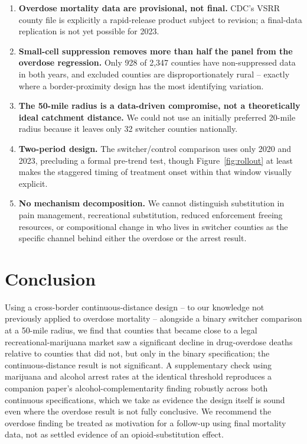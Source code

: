 \documentclass[11pt]{article}
\begin{document}
\begin{enumerate}[label=(\arabic*), leftmargin=*]
\item \textbf{Overdose mortality data are provisional, not final.}
CDC's VSRR county file is explicitly a rapid-release product subject
to revision; a final-data replication is not yet possible for 2023.
\item \textbf{Small-cell suppression removes more than half the panel
from the overdose regression.} Only 928 of 2,347 counties have
non-suppressed data in both years, and excluded counties are
disproportionately rural -- exactly where a border-proximity design has
the most identifying variation.
\item \textbf{The 50-mile radius is a data-driven compromise, not a
theoretically ideal catchment distance.} We could not use an initially
preferred 20-mile radius because it leaves only 32 switcher counties
nationally.
\item \textbf{Two-period design.} The switcher/control comparison uses
only 2020 and 2023, precluding a formal pre-trend test, though
Figure~\ref{fig:rollout} at least makes the staggered timing of
treatment onset within that window visually explicit.
\item \textbf{No mechanism decomposition.} We cannot distinguish
substitution in pain management, recreational substitution, reduced
enforcement freeing resources, or compositional change in who lives in
switcher counties as the specific channel behind either the overdose
or the arrest result.
\end{enumerate}

\section{Conclusion}

Using a cross-border continuous-distance design -- to our knowledge not
previously applied to overdose mortality -- alongside a binary
switcher comparison at a 50-mile radius, we find that counties that
became close to a legal recreational-marijuana market saw a
significant decline in drug-overdose deaths relative to counties that
did not, but only in the binary specification; the continuous-distance
result is not significant. A supplementary check using marijuana and
alcohol arrest rates at the identical threshold reproduces a companion
paper's alcohol-complementarity finding robustly across both
continuous specifications, which we take as evidence the design itself
is sound even where the overdose result is not fully conclusive. We
recommend the overdose finding be treated as motivation for a
follow-up using final mortality data, not as settled evidence of an
opioid-substitution effect.



\end{document}
